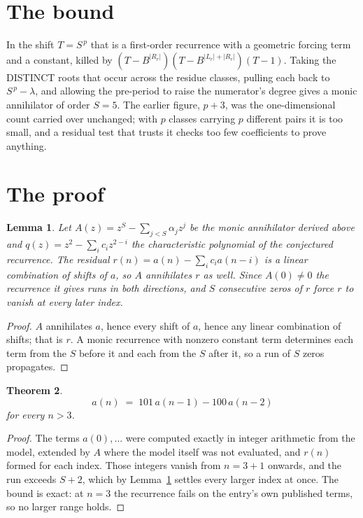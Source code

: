 \documentclass[11pt,a4paper]{article}
\theoremstyle{plain}
\newtheorem{theorem}{Theorem}
\newtheorem{lemma}[theorem]{Lemma}
\theoremstyle{definition}
\begin{document}
\section{The bound}

In the shift $T=S^{\,p}$ that is a first-order recurrence with a geometric forcing term and a
constant, killed by $(T-B^{|R_r|})(T-B^{|L_r|+|R_r|})(T-1)$. Taking the DISTINCT roots that
occur across the residue classes, pulling each back to $S^{\,p}-\lambda$, and allowing the
pre-period to raise the numerator's degree gives a monic annihilator of order $S=5$. The
earlier figure, $p+3$, was the one-dimensional count carried over unchanged; with $p$ classes
carrying $p$ different pairs it is too small, and a residual test that trusts it checks too few
coefficients to prove anything.

\section{The proof}

\begin{lemma}\label{lem:crit}
Let $A(z)=z^S-\sum_{j<S}\alpha_jz^{j}$ be the monic annihilator derived above and
$q(z)=z^{2}-\sum_ic_iz^{2-i}$ the characteristic polynomial of the conjectured
recurrence. The residual $r(n)=a(n)-\sum_ic_ia(n-i)$ is a linear combination of shifts of $a$,
so $A$ annihilates $r$ as well. Since $A(0)\ne0$ the recurrence it gives runs in both
directions, and $S$ consecutive zeros of $r$ force $r$ to vanish at every later index.
\end{lemma}

\begin{proof}
$A$ annihilates $a$, hence every shift of $a$, hence any linear combination of shifts; that is
$r$. A monic recurrence with nonzero constant term determines each term from the $S$ before it
and each from the $S$ after it, so a run of $S$ zeros propagates.
\end{proof}

\begin{theorem}
\[
a(n)\;=\;101\,a(n-1) - 100\,a(n-2)
\]
for every $n>3$.
\end{theorem}

\begin{proof}
The terms $a(0),\dots$ were computed exactly in integer arithmetic from the model, extended by
$A$ where the model itself was not evaluated, and $r(n)$ formed for each index. Those integers
vanish from $n=3+1$ onwards, and the run exceeds $S+2$, which by
Lemma~\ref{lem:crit} settles every larger index at once. The bound is exact: at $n=3$ the recurrence fails on the entry's own published terms, so no larger range holds.
\end{proof}
\end{document}
